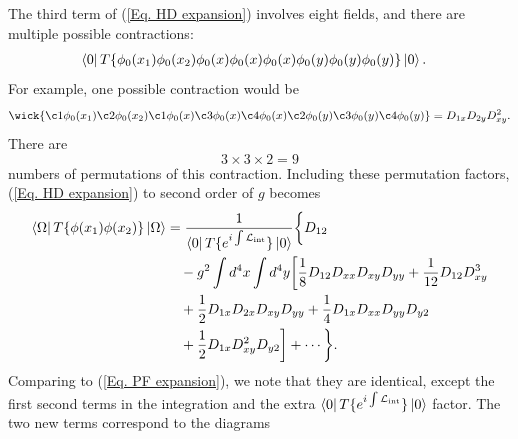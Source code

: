 \documentclass[11pt]{article}
\theoremstyle{definition}
\begin{document}
The third term of (\ref{Eq. HD expansion}) involves eight fields, and there are multiple possible contractions:
\begin{equation}
    \begin{aligned}
        &\bra{0}T\{\phi_0(x_1)\phi_0(x_2)\phi_0(x)\phi_0(x)\phi_0(x)\phi_0(y)\phi_0(y)\phi_0(y)\}\ket{0}.
    \end{aligned}
\end{equation}
For example, one possible contraction would be
\begin{equation}
    \wick{\c1 \phi_0(x_1)\c2 \phi_0(x_2)\c1 \phi_0(x)\c3 \phi_0(x)\c4 \phi_0(x)\c2 \phi_0(y)\c3 \phi_0(y)\c4 \phi_0(y)} = D_{1x}D_{2y}D_{xy}^2.
\end{equation}
There are
\begin{equation}
    3 \times 3 \times 2 = 9
\end{equation}
numbers of permutations of this contraction. Including these permutation factors, (\ref{Eq. HD expansion}) to second order of $g$ becomes
\begin{equation}
    \begin{aligned}
        \bra{\Omega} T \{ \phi(x_1) \phi(x_2) \} \ket{\Omega} 
&= \frac{1}{\bra{0} T \{ e^{i \int \mathcal{L}_{\text{int}} }\}  \ket{0}} 
\bigg\{ D_{12} \\
&\quad - g^2 \int d^4x \int d^4y \bigg[ 
\frac{1}{8} D_{12} D_{xx} D_{xy} D_{yy} + \frac{1}{12} D_{12} D_{xy}^3 \\
&\quad + \frac{1}{2} D_{1x} D_{2x} D_{xy} D_{yy} + \frac{1}{4} D_{1x} D_{xx} D_{yy} D_{y2} \\
&\quad + \frac{1}{2} D_{1x} D_{xy}^2 D_{y2} \bigg] + \cdots \bigg\}.
    \end{aligned}
\end{equation}
Comparing to (\ref{Eq. PF expansion}), we note that they are identical, except the first second terms in the integration and the extra $\bra{0} T \{ e^{i \int \mathcal{L}_{\text{int}} }\}\ket{0}$ factor. The two new terms correspond to the diagrams
\begin{center}
\end{center}
\end{document}
